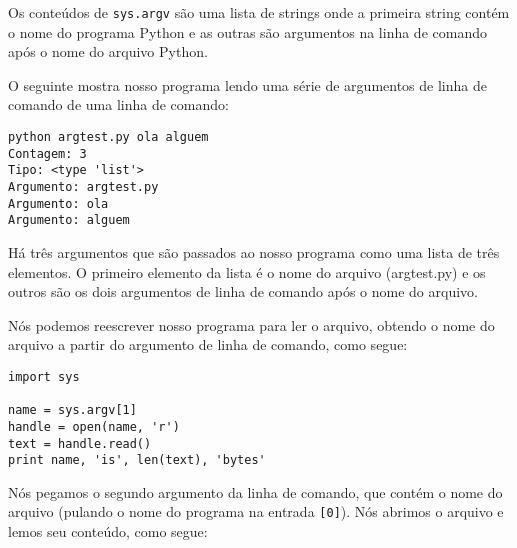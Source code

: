 Os conteúdos de {\tt sys.argv} são uma lista de strings onde a primeira string 
contém o nome do programa Python e as outras são argumentos na linha de comando após 
o nome do arquivo Python.

O seguinte mostra nosso programa lendo uma série de argumentos de linha de comando de uma linha de comando:

\beforeverb
\begin{verbatim}
python argtest.py ola alguem
Contagem: 3
Tipo: <type 'list'>
Argumento: argtest.py
Argumento: ola
Argumento: alguem
\end{verbatim}
\afterverb

Há três argumentos que são passados ao nosso programa como uma lista de três elementos. 
O primeiro elemento da lista é o nome do arquivo (argtest.py) e os outros são
os dois argumentos de linha de comando após o nome do arquivo.

Nós podemos reescrever nosso programa para ler o arquivo, obtendo o nome do arquivo
a partir do argumento de linha de comando, como segue:

\beforeverb
\begin{verbatim}
import sys

name = sys.argv[1]
handle = open(name, 'r')
text = handle.read()
print name, 'is', len(text), 'bytes'
\end{verbatim}
\afterverb
%

Nós pegamos o segundo argumento da linha de comando, que contém o nome do arquivo (pulando o nome do programa na entrada {\tt [0]}).
Nós abrimos o arquivo e lemos seu conteúdo, como segue:

